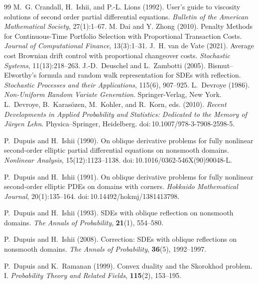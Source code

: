 \documentclass[11pt]{article}
\theoremstyle{definition}
\theoremstyle{plain}
\begin{document}
\begin{singlespace}
\begin{thebibliography}{99}
   M.~G. Crandall, H.~Ishii, and P.-L. Lions (1992). \newblock User's guide to viscosity solutions of second order partial differential equations. \newblock \emph{Bulletin of the American Mathematical Society}, 27(1):1--67.
   M. Dai and Y. Zhong (2010). \newblock Penalty Methods for Continuous-Time Portfolio Selection with Proportional Transaction Costs. \newblock \emph{Journal of Computational Finance}, 13(3):1--31.
   J.~H. van de Vate (2021). \newblock Average cost Brownian drift control with proportional changeover costs. \newblock \emph{Stochastic Systems}, 11(13):218--263.
J.-D.~Deuschel and L.~Zambotti (2005).
Bismut--Elworthy's formula and random walk representation for SDEs with reflection.
\emph{Stochastic Processes and their Applications}, 115(6), 907--925.
   L.~Devroye (1986). \newblock \emph{Non-Uniform Random Variate Generation}. \newblock Springer-Verlag, New York.
L.~Devroye, B.~Karas\"ozen, M.~Kohler, and R.~Korn, eds. (2010).
\newblock \emph{Recent Developments in Applied Probability and Statistics: Dedicated to the Memory of J\"urgen Lehn}.
\newblock Physica–Springer, Heidelberg. \newblock doi:\,10.1007/978-3-7908-2598-5.

P.~Dupuis and H.~Ishii (1990).
\newblock On oblique derivative problems for fully nonlinear second-order elliptic partial differential equations on nonsmooth domains.
\newblock \emph{Nonlinear Analysis}, 15(12):1123--1138. \newblock doi:\,10.1016/0362-546X(90)90048-L.

P.~Dupuis and H.~Ishii (1991).
\newblock On oblique derivative problems for fully nonlinear second-order elliptic PDEs on domains with corners.
\newblock \emph{Hokkaido Mathematical Journal}, 20(1):135--164. \newblock doi:\,10.14492/hokmj/1381413798.

P.~Dupuis and H.~Ishii (1993).
SDEs with oblique reflection on nonsmooth domains.
\emph{The Annals of Probability}, \textbf{21}(1), 554--580.

P.~Dupuis and H.~Ishii (2008).
Correction: SDEs with oblique reflections on nonsmooth domains.
\emph{The Annals of Probability}, \textbf{36}(5), 1992--1997.

P.~Dupuis and K.~Ramanan (1999).
Convex duality and the Skorokhod problem. I.
\emph{Probability Theory and Related Fields}, \textbf{115}(2), 153--195.


\end{thebibliography}
\end{singlespace}
\end{document}
